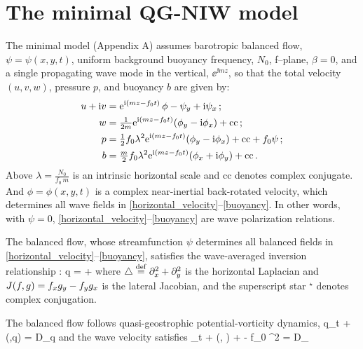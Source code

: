 \documentclass{jfm}
\begin{document}
\section{The \cite{xie_vanneste2015} minimal QG-NIW model}
The \cite{xie_vanneste2015} minimal model (Appendix A) assumes
barotropic balanced flow, $\psi=\psi(x,y,t)$,
uniform background buoyancy frequency, $N_0$, f--plane, $\beta=0$, and a single
propagating wave mode in the vertical, $\ee^{\ii m z}$, so that the
total velocity $(u,v,w)$, pressure $p$, and buoyancy $b$ are given by:
\begin{align}
\label{horizontal_velocity}
u + {\rm i} v  &= {\rm e}^{{\rm i} (m z - f_0 t)}\,\phi -\psi_y + {\rm i}\psi_x\,;\\
  \label{vertical_velocity}
  w &= \tfrac{1}{2 m}{\rm e}^{{\rm i} (m z - f_0 t)}(\phi_y-{\rm i}\phi_x)  + \text{cc}  \,;\\
\label{pressure}
\qquad p &= \tfrac{1}{2} f_0\lambda^2{\rm e}^{{\rm i} (m z - f_0 t)}(\phi_y-{\rm i}\phi_x)
+\text{cc} + f_0 \psi \,;\\
\label{buoyancy}
b &=  \tfrac{m}{2} f_0\lambda^2{\rm e}^{{\rm i} (m z - f_0 t)}(\phi_x+{\rm i}\phi_y) + \text{cc}
  \, .
\end{align}
Above $\lambda = \tfrac{N_0}{f_0\, m}$ is an intrinsic horizontal scale and cc denotes
complex conjugate. And $\phi = \phi(x,y,t)$ is a complex near-inertial back-rotated velocity,
which determines all wave fields in \eqref{horizontal_velocity}--\eqref{buoyancy}.
In other words, with $\psi=0$, \eqref{horizontal_velocity}--\eqref{buoyancy}
are wave polarization relations.

The balanced flow,
whose streamfunction $\psi$ determines all balanced fields in
\eqref{horizontal_velocity}--\eqref{buoyancy}, satisfies the
wave-averaged inversion relationship
\citep[cf. ][]{wagner_young2015}:
\beq
\label{qgpv}
q = \lap \psi +
                 \com
\eeq
where $\triangle \stackrel{\mathrm{def}}{=} \partial_x^2 + \partial_y^2$ is the horizontal
Laplacian and $J(f,g)=f_x g_y - f_y g_x$ is the lateral Jacobian, and
the superscript star $^\star$ denotes complex conjugation.

The balanced flow follows quasi-geostrophic potential-vorticity dynamics,
\beq
\label{macroturb}
q_t + \sJ(\psi,q) = D_q\com
\eeq
and the wave velocity satisfies
\beq
\label{waves}
\phi_t + \sJ(\psi, \phi) + \phi\lap \psi -  f_0 \lambda^2 \lap \phi
 = D_\phi\per
\eeq
\end{document}
